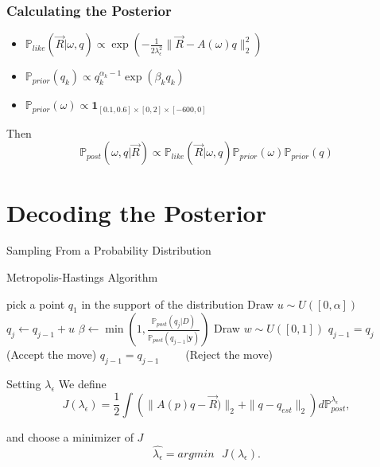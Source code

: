 \documentclass[11pt]{beamer}
\theoremstyle{plain}
\theoremstyle{definition}
\newcommand\ChangeFont{\fontsize{9}{7.2}\selectfont}
\newcommand{\y}{\textbf{y}}
\newcommand{\p}{\mathbb{P}}
\newcommand{\like}{\p_{like}}
\newcommand{\prior}{\p_{prior}}
\newcommand{\post}{\p_{post}}
\begin{document}
\begin{frame}
\frametitle{Calculating the Posterior}
\begin{itemize}
\item $\like(\vec{R}|\omega,q)\propto
\exp\left(-\frac{1}{2\lambda_{\epsilon}^{2}}\|\vec{R}-A(\omega)q\|^{2}_{2}\right)$
\item $\prior(q_{k})\propto q_{k}^{\alpha_{k}-1}\exp(\beta_{k}q_{k})$
\item $\prior(\omega)\propto\textbf{1}_{[0.1,0.6]\times[0,2]\times[-600,0]}$
\end{itemize}
\bigskip
Then
\begin{equation*}
\post(\omega,q|\vec{R})\propto\like(\vec{R}|\omega,q)\prior(\omega)\prior(q)
\end{equation*}
\end{frame}




\section{Decoding the Posterior}


\begin{frame}{Sampling From a Probability Distribution}
%
\begin{algorithm}[H]
\ChangeFont
\caption{Metropolis-Hastings Algorithm}
\begin{algorithmic}[1]\label{algMH}
\State pick a point $q_{1}$ in the support of the distribution
\State Draw $u\sim U([0,\alpha])$
\State $q_{j}\leftarrow q_{j-1}+u$
\State $\beta\leftarrow\min(1,\frac{\post(q_{j}|D)}{\post(q_{j-1}|\y)})$
\State Draw $w\sim U([0,1])$
\State $q_{j-1}=q_{j}\qquad$   (Accept the move)
\Else
\State $q_{j-1}=q_{j-1}\qquad$ (Reject the move)
\EndIf
\EndFor
\end{algorithmic}
\end{algorithm}
\end{frame}

\begin{frame}{Setting $\lambda_{\epsilon}$}
We define
\begin{equation*}
J(\lambda_{\epsilon})=\frac{1}{2}\int\left(\|A(p)q-\vec{R})\|_{2}+\|q-q_{est}\|_{2}\right)d\post^{\lambda_{\epsilon}},
\end{equation*}

and choose a minimizer of $J$ 
\begin{equation*}
\hat{\lambda_{\epsilon}}=argmin\text{ } J(\lambda_{\epsilon}).
\end{equation*}

\end{frame}
\end{document}
